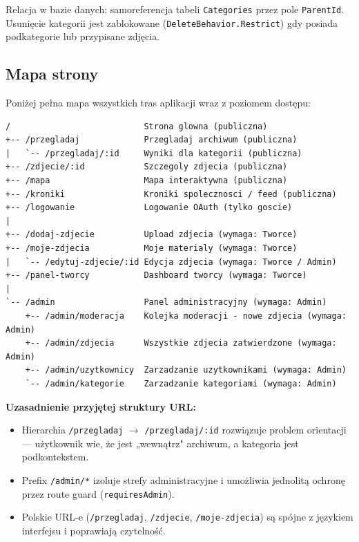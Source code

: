 \documentclass[12pt, a4paper]{article}
\begin{document}
Relacja w bazie danych: samoreferencja tabeli \texttt{Categories} przez pole \texttt{ParentId}.
Usunięcie kategorii jest zablokowane (\texttt{DeleteBehavior.Restrict}) gdy posiada
podkategorie lub przypisane zdjęcia.

\subsection{Mapa strony}

Poniżej pełna mapa wszystkich tras aplikacji wraz z poziomem dostępu:

\begin{lstlisting}[style=plain, caption={Mapa strony (sitemap)}]
/                           Strona glowna (publiczna)
+-- /przegladaj             Przegladaj archiwum (publiczna)
|   `-- /przegladaj/:id     Wyniki dla kategorii (publiczna)
+-- /zdjecie/:id            Szczegoly zdjecia (publiczna)
+-- /mapa                   Mapa interaktywna (publiczna)
+-- /kroniki                Kroniki spolecznosci / feed (publiczna)
+-- /logowanie              Logowanie OAuth (tylko goscie)
|
+-- /dodaj-zdjecie          Upload zdjecia (wymaga: Tworce)
+-- /moje-zdjecia           Moje materialy (wymaga: Tworce)
|   `-- /edytuj-zdjecie/:id Edycja zdjecia (wymaga: Tworce / Admin)
+-- /panel-tworcy           Dashboard tworcy (wymaga: Tworce)
|
`-- /admin                  Panel administracyjny (wymaga: Admin)
    +-- /admin/moderacja    Kolejka moderacji - nowe zdjecia (wymaga: Admin)
    +-- /admin/zdjecia      Wszystkie zdjecia zatwierdzone (wymaga: Admin)
    +-- /admin/uzytkownicy  Zarzadzanie uzytkownikami (wymaga: Admin)
    `-- /admin/kategorie    Zarzadzanie kategoriami (wymaga: Admin)
\end{lstlisting}

\textbf{Uzasadnienie przyjętej struktury URL:}
\begin{itemize}
  \item Hierarchia \texttt{/przegladaj} $\to$ \texttt{/przegladaj/:id} rozwiązuje problem
        orientacji — użytkownik wie, że jest „wewnątrz" archiwum, a kategoria jest podkontekstem.
  \item Prefix \texttt{/admin/*} izoluje strefy administracyjne i umożliwia jednolitą ochronę
        przez route guard (\texttt{requiresAdmin}).
  \item Polskie URL-e (\texttt{/przegladaj}, \texttt{/zdjecie}, \texttt{/moje-zdjecia}) są spójne
        z językiem interfejsu i poprawiają czytelność.
\end{itemize}
\end{document}
